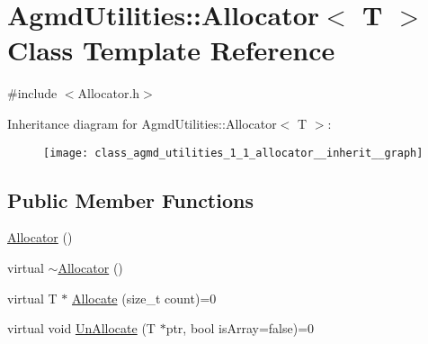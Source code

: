 \hypertarget{class_agmd_utilities_1_1_allocator}{\section{Agmd\+Utilities\+:\+:Allocator$<$ T $>$ Class Template Reference}
\label{class_agmd_utilities_1_1_allocator}
}


{\ttfamily \#include $<$Allocator.\+h$>$}



Inheritance diagram for Agmd\+Utilities\+:\+:Allocator$<$ T $>$\+:
\nopagebreak
\begin{figure}[H]
\begin{center}
\leavevmode
\texttt{[image: class\_agmd\_utilities\_1\_1\_allocator\_\_inherit\_\_graph]}
\end{center}
\end{figure}
\subsection*{Public Member Functions}
\begin{DoxyCompactItemize}
\item 
\hyperlink{class_agmd_utilities_1_1_allocator_a7dd21216bf412fc979f461b1fcef802f}{Allocator} ()
\item 
virtual \hyperlink{class_agmd_utilities_1_1_allocator_a9f3ebfbeffac208d98f8824160836714}{$\sim$\+Allocator} ()
\item 
virtual T $\ast$ \hyperlink{class_agmd_utilities_1_1_allocator_afc785283cbeeec5ff8c058ff15a96ac4}{Allocate} (size\+\_\+t count)=0
\item 
virtual void \hyperlink{class_agmd_utilities_1_1_allocator_ae48911dc2d192011add15e54eb711a86}{Un\+Allocate} (T $\ast$ptr, bool is\+Array=false)=0
\end{DoxyCompactItemize}


